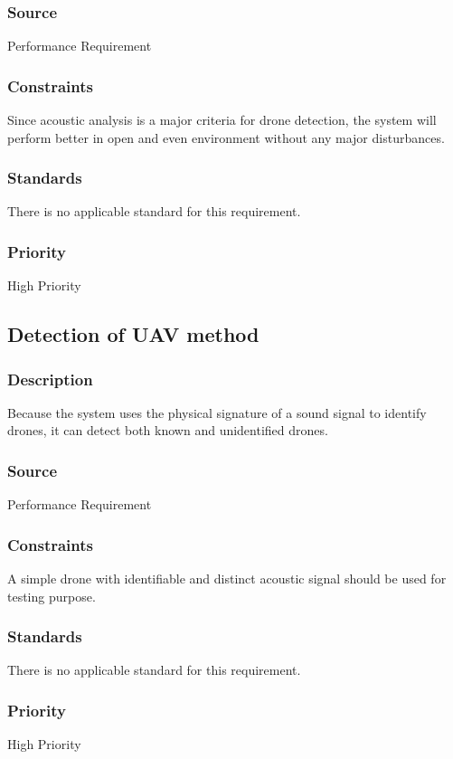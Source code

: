\subsubsection{Source}
Performance Requirement
\subsubsection{Constraints}
Since acoustic analysis is a major criteria for drone detection, the system will perform better in open and even environment without any major disturbances.
\subsubsection{Standards}
There is no applicable standard for this requirement.
\subsubsection{Priority}
High Priority

\subsection{Detection of UAV method}
\subsubsection{Description}
Because the system uses the physical signature of a sound signal to identify drones, it can detect both known and unidentified drones.
\subsubsection{Source}
Performance Requirement
\subsubsection{Constraints}
A simple drone with identifiable and distinct acoustic signal should be used for testing purpose.
\subsubsection{Standards}
There is no applicable standard for this requirement.
\subsubsection{Priority}
High Priority
